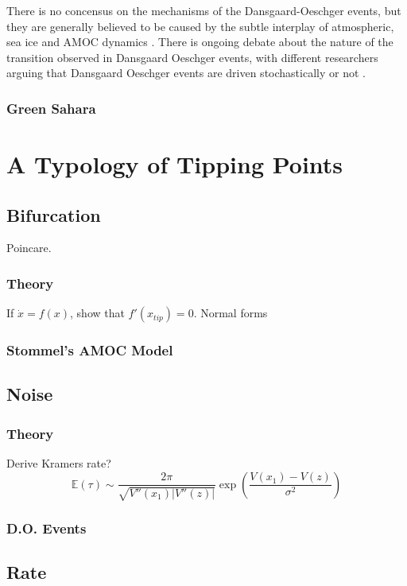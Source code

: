There is no concensus on the mechanisms of the Dansgaard-Oeschger events, but they are generally believed to be caused by the subtle interplay of atmospheric, sea ice and AMOC dynamics
\parencite{Vettoretti2022,Boers2018,Riechers2023arxiv}. There is ongoing debate about the nature of the transition observed in Dansgaard Oeschger events, with different researchers arguing
that Dansgaard Oeschger events are driven stochastically \parencite{Ditlevsen2010,Ditlevsen1999} or not \parencite{Boers2018a}.


\subsubsection{Green Sahara}

\section{A Typology of Tipping Points}
\label{sec:tipping_typology}
\subsection{Bifurcation}
Poincare.
\subsubsection{Theory}
If $\dot{x} = f(x)$, show that $f'(x_{tip}) = 0$. Normal forms
\subsubsection{Stommel's AMOC Model}
\subsection{Noise}
\subsubsection{Theory}
Derive Kramers rate?
\begin{equation}
  \label{eq:kramers_law}
  \mathbb{E}(\tau) \sim \frac{2\pi}{\sqrt{V''(x_1)\left|V''(z)\right|}} \exp \left(\frac{V(x_1) - V(z)}{\sigma^2}\right)
\end{equation}
\subsubsection{D.O. Events}
\subsection{Rate}
